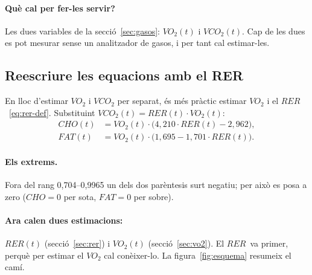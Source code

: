 \documentclass[10pt,a4paper]{article}
\newcommand{\cho}{\ensuremath{\mathit{CHO}}}               %
\newcommand{\fat}{\ensuremath{\mathit{FAT}}}
\newcommand{\VO}{\ensuremath{\mathit{VO}_2}}               %
\newcommand{\VCO}{\ensuremath{\mathit{VCO}_2}}
\newcommand{\RER}{\ensuremath{\mathit{RER}}}
\begin{document}
\paragraph{Què cal per fer-les servir?} Les dues variables de la
secció~\ref{sec:gasos}: $\VO(t)$ i $\VCO(t)$. Cap de les dues es pot mesurar sense un
analitzador de gasos, i per tant cal estimar-les.

\subsection{Reescriure les equacions amb el RER}\label{sec:jw-rer}
En lloc d'estimar $\VO$ i $\VCO$ per separat, és més pràctic estimar $\VO$ i el
\RER~\eqref{eq:rer-def}. Substituint $\VCO(t)=\RER(t)\cdot\VO(t)$:
\begin{align}
  \cho(t) &= \VO(t)\cdot\bigl(4{,}210\cdot\RER(t)-2{,}962\bigr), \label{eq:jw-cho-rer}\\
  \fat(t) &= \VO(t)\cdot\bigl(1{,}695-1{,}701\cdot\RER(t)\bigr). \label{eq:jw-fat-rer}
\end{align}

\paragraph{Els extrems.} Fora del rang 0,704--0,9965 un dels dos parèntesis surt negatiu;
per això es posa a zero ($\cho=0$ per sota, $\fat=0$ per sobre).

\needspace{12cm}
\paragraph{Ara calen dues estimacions:} $\RER(t)$ (secció~\ref{sec:rer}) i $\VO(t)$
(secció~\ref{sec:vo2}). El \RER\ va primer, perquè per estimar el $\VO$ cal conèixer-lo.
La figura~\ref{fig:esquema} resumeix el camí.
\end{document}
